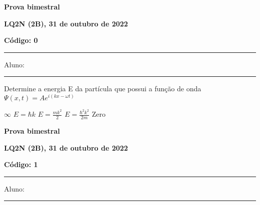 \documentclass[12pt, addpoints]{exam}
\begin{document}
        \begin{minipage}[b]{0.75\linewidth}
            \begin{flushleft}
                {\bf \large Prova bimestral}
            \end{flushleft}
            \begin{flushleft}
                {\bf \large LQ2N (2B), 31 de outubro de 2022}
            \end{flushleft}
        \end{minipage}
        \begin{minipage}[b]{0.20\linewidth}
            \begin{flushright}
                {\bf \large Código: 0}
            \end{flushright}
        \end{minipage}
        \vspace{0.5cm} \hrule \vspace{0.5cm}
        \begin{minipage}{0.75\linewidth}
            Aluno:
        \end{minipage}
        \vspace{0.5cm} \hrule \vspace{0.5cm}

        \begin{questions}
\begin{multicols*}{2}
\question[20] Determine a energia E da partícula que possui a função de onda $\Psi(x,t)=Ae^{i(kx-\omega t)}$

\begin{choices}
\choice $\infty$ \choice $E=\hbar k$ \choice $E = \frac{mk^2}{2}$ \choice $E=\frac{\hbar^2k^2}{2m}$ \choice Zero \end{choices}
\end{multicols*}
\end{questions}
\newpage
        \begin{minipage}[b]{0.75\linewidth}
            \begin{flushleft}
                {\bf \large Prova bimestral}
            \end{flushleft}
            \begin{flushleft}
                {\bf \large LQ2N (2B), 31 de outubro de 2022}
            \end{flushleft}
        \end{minipage}
        \begin{minipage}[b]{0.20\linewidth}
            \begin{flushright}
                {\bf \large Código: 1}
            \end{flushright}
        \end{minipage}
        \vspace{0.5cm} \hrule \vspace{0.5cm}
        \begin{minipage}{0.75\linewidth}
            Aluno:
        \end{minipage}
        \vspace{0.5cm} \hrule \vspace{0.5cm}
\end{document}
